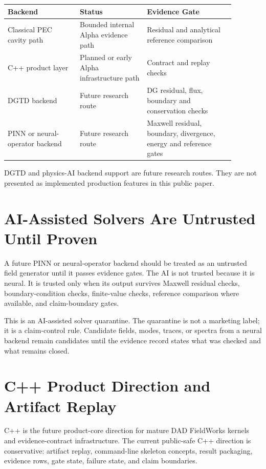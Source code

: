 \documentclass[11pt,a4paper]{article}
\begin{document}
\begin{center}
\begin{tabular}{p{0.28\linewidth}p{0.26\linewidth}p{0.34\linewidth}}
\toprule
Backend & Status & Evidence Gate \\
\midrule
Classical PEC cavity path & Bounded internal Alpha evidence path & Residual and analytical reference comparison \\
C++ product layer & Planned or early Alpha infrastructure path & Contract and replay checks \\
DGTD backend & Future research route & DG residual, flux, boundary and conservation checks \\
PINN or neural-operator backend & Future research route & Maxwell residual, boundary, divergence, energy and reference gates \\
\bottomrule
\end{tabular}
\end{center}

DGTD and physics-AI backend support are future research routes. They are not presented as implemented production features in this public paper.

\section{AI-Assisted Solvers Are Untrusted Until Proven}

A future PINN or neural-operator backend should be treated as an untrusted field generator until it passes evidence gates. The AI is not trusted because it is neural. It is trusted only when its output survives Maxwell residual checks, boundary-condition checks, finite-value checks, reference comparison where available, and claim-boundary gates.

This is an AI-assisted solver quarantine. The quarantine is not a marketing label; it is a claim-control rule. Candidate fields, modes, traces, or spectra from a neural backend remain candidates until the evidence record states what was checked and what remains closed.

\section{C++ Product Direction and Artifact Replay}

C++ is the future product-core direction for mature DAD FieldWorks kernels and evidence-contract infrastructure. The current public-safe C++ direction is conservative: artifact replay, command-line skeleton concepts, result packaging, evidence rows, gate state, failure state, and claim boundaries.
\end{document}
